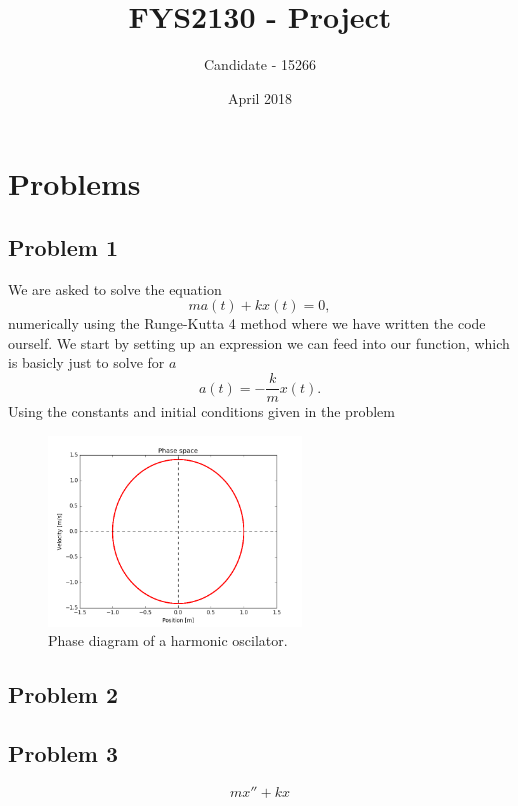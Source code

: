 \documentclass{article}
\title{FYS2130 - Project}
\author{Candidate - 15266}
\date{April 2018}
\begin{document}
\maketitle

\section*{Problems}

\subsection*{Problem 1}
We are asked to solve the equation
\begin{equation}
ma(t) + kx(t) = 0,
\end{equation}
numerically using the Runge-Kutta 4 method where we have written the code ourself. We start by setting up an expression we can feed into our function, which is basicly just to solve for $a$
\begin{equation}
a(t) = -\frac{k}{m}x(t).
\end{equation}
Using the constants and initial conditions given in the problem
\begin{figure}[H]
\centering
\includegraphics[width=0.6\textwidth]{problem_1_1}
\caption{Phase diagram of a harmonic oscilator.}
\label{fig:problem_b_contour_fig}
\end{figure}


\subsection*{Problem 2}



\subsection*{Problem 3}
\begin{equation}
mx'' + kx
\end{equation}
\end{document}
